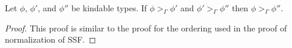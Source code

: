 \begin{lemma}
  Let $\phi$, $\phi'$, and $\phi''$ be kindable types.  If $\phi >_\Gamma \phi'$ and 
  $\phi' >_\Gamma \phi''$ then $\phi >_\Gamma \phi''$.
  \label{lemma:transitivity_ssfp}
\end{lemma}
\begin{proof}
  This proof is similar to the proof for the ordering used in the
  proof of normalization of SSF.
  

\end{proof}

